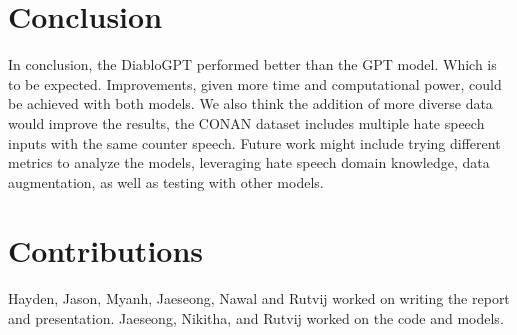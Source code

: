 \documentclass[10pt,twocolumn]{article}
\begin{document}
\section{Conclusion}
In conclusion, the DiabloGPT performed better than the GPT model. Which is to be expected.
Improvements, given more time and computational power, could be achieved with both models.
We also think the addition of more diverse data would improve the results, the CONAN dataset
includes multiple hate speech inputs with the same counter speech.
Future work might include trying different metrics to analyze the models,
leveraging hate speech domain knowledge, data augmentation, as well as testing with other models.

\section{Contributions}
Hayden, Jason, Myanh, Jaeseong, Nawal and Rutvij worked on writing the report and presentation. Jaeseong, Nikitha,
and Rutvij worked on the code and models.




\end{document}
